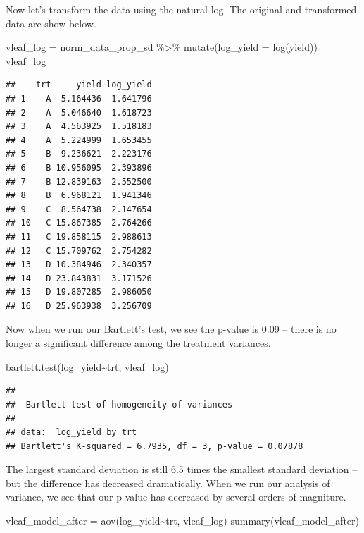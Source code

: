\documentclass[
]{book}
\newenvironment{Shaded}{\begin{snugshade}}{\end{snugshade}}
\newcommand{\AttributeTok}[1]{\textcolor[rgb]{0.77,0.63,0.00}{#1}}
\newcommand{\FunctionTok}[1]{\textcolor[rgb]{0.00,0.00,0.00}{#1}}
\newcommand{\NormalTok}[1]{#1}
\newcommand{\OtherTok}[1]{\textcolor[rgb]{0.56,0.35,0.01}{#1}}
\newcommand{\SpecialCharTok}[1]{\textcolor[rgb]{0.00,0.00,0.00}{#1}}
\begin{document}
Now let's transform the data using the natural log. The original and transformed data are show below.

\begin{Shaded}
\begin{Highlighting}[]
\NormalTok{vleaf\_log }\OtherTok{=}\NormalTok{ norm\_data\_prop\_sd }\SpecialCharTok{\%\textgreater{}\%}
  \FunctionTok{mutate}\NormalTok{(}\AttributeTok{log\_yield =} \FunctionTok{log}\NormalTok{(yield))}
\NormalTok{vleaf\_log}
\end{Highlighting}
\end{Shaded}

\begin{verbatim}
##    trt     yield log_yield
## 1    A  5.164436  1.641796
## 2    A  5.046640  1.618723
## 3    A  4.563925  1.518183
## 4    A  5.224999  1.653455
## 5    B  9.236621  2.223176
## 6    B 10.956095  2.393896
## 7    B 12.839163  2.552500
## 8    B  6.968121  1.941346
## 9    C  8.564738  2.147654
## 10   C 15.867385  2.764266
## 11   C 19.858115  2.988613
## 12   C 15.709762  2.754282
## 13   D 10.384946  2.340357
## 14   D 23.843831  3.171526
## 15   D 19.807285  2.986050
## 16   D 25.963938  3.256709
\end{verbatim}

Now when we run our Bartlett's test, we see the p-value is 0.09 -- there is no longer a significant difference among the treatment variances.

\begin{Shaded}
\begin{Highlighting}[]
\FunctionTok{bartlett.test}\NormalTok{(log\_yield}\SpecialCharTok{\textasciitilde{}}\NormalTok{trt, vleaf\_log)}
\end{Highlighting}
\end{Shaded}

\begin{verbatim}
## 
##  Bartlett test of homogeneity of variances
## 
## data:  log_yield by trt
## Bartlett's K-squared = 6.7935, df = 3, p-value = 0.07878
\end{verbatim}

The largest standard deviation is still 6.5 times the smallest standard deviation -- but the difference has decreased dramatically. When we run our analysis of variance, we see that our p-value has decreased by several orders of magniture.

\begin{Shaded}
\begin{Highlighting}[]
\NormalTok{vleaf\_model\_after }\OtherTok{=} \FunctionTok{aov}\NormalTok{(log\_yield}\SpecialCharTok{\textasciitilde{}}\NormalTok{trt, vleaf\_log)}
\FunctionTok{summary}\NormalTok{(vleaf\_model\_after)}
\end{Highlighting}
\end{Shaded}
\end{document}
